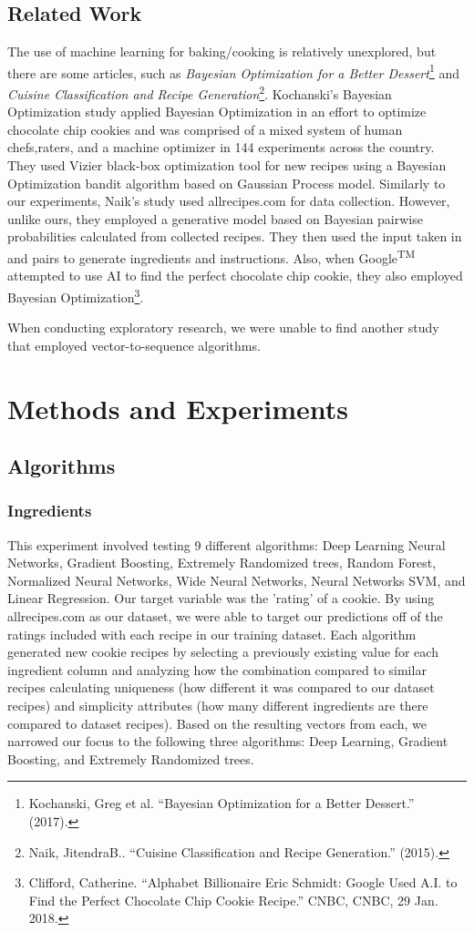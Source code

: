 \documentclass[11pt, a4paper]{article}
\begin{document}
		\subsection*{Related Work}
		The use of machine learning for baking/cooking is relatively unexplored, but there are some articles, such as \textit{Bayesian Optimization for a Better Dessert}\footnote{Kochanski, Greg et al. “Bayesian Optimization for a Better Dessert.” (2017).} and \textit{Cuisine Classification and Recipe Generation}\footnote{Naik, JitendraB.. “Cuisine Classification and Recipe Generation.” (2015).}. Kochanski's Bayesian Optimization study applied Bayesian Optimization in an effort to optimize chocolate chip cookies and was comprised of a mixed system of human chefs,raters, and a machine optimizer in 144 experiments across the country. They used Vizier black-box optimization tool for new recipes using a Bayesian Optimization bandit algorithm based on Gaussian Process model. 
		Similarly to our experiments, Naik's study used allrecipes.com for data collection. However, unlike ours, they employed a generative model based on Bayesian pairwise probabilities calculated from collected recipes. They then used  the  input taken in and pairs to generate ingredients and instructions. Also, when Google\textsuperscript{TM} attempted to use AI to find the perfect chocolate chip cookie, they also employed Bayesian Optimization\footnote{Clifford, Catherine. “Alphabet Billionaire Eric Schmidt: Google Used A.I. to Find the Perfect Chocolate Chip Cookie Recipe.” CNBC, CNBC, 29 Jan. 2018.}.
		
		When conducting exploratory research, we were unable to find another study that employed vector-to-sequence algorithms. 
		
		\section{Methods and Experiments}
		\subsection{Algorithms}
		\subsubsection{Ingredients}
		This experiment involved testing 9 different algorithms: Deep Learning Neural Networks, Gradient Boosting, Extremely Randomized trees, Random Forest, Normalized Neural Networks, Wide Neural Networks, Neural Networks SVM, and Linear Regression. Our target variable was the 'rating' of a cookie. By using allrecipes.com as our dataset, we were able to target our predictions off of the ratings included with each recipe in our training dataset. Each algorithm generated new cookie recipes by selecting a previously existing value for each ingredient column and analyzing how the combination compared to similar recipes calculating uniqueness (how different it was compared to our dataset recipes) and simplicity attributes (how many different ingredients are there compared to dataset recipes). Based on the resulting vectors from each, we narrowed our focus to the following three algorithms: Deep Learning, Gradient Boosting, and Extremely Randomized trees. 
\end{document}
